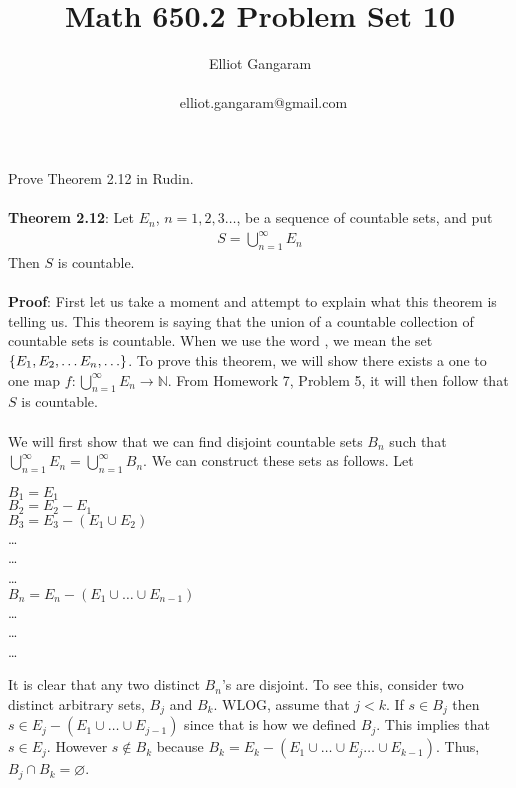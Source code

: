 \documentclass[12pt]{article}
\title{Math 650.2  Problem Set 10}
\author{Elliot Gangaram\\
\date{}
\ elliot.gangaram@gmail.com \\}
\begin{document}
\maketitle

\problem
Prove Theorem 2.12 in Rudin. \\ \\

\noindent \textbf{Theorem 2.12}: Let $E_{n}$, $n=1, 2, 3 \ldots$, be a sequence of countable sets, and put 
\begin{align*}
S= \bigcup^{\infty}_{n=1} E_{n}
\end{align*}
Then $S$ is countable. \\ \\

\noindent \textbf{Proof}: First let us take a moment and attempt to explain what this theorem is telling us. This theorem is saying that the union of a countable collection of countable sets is countable. When we use the word , we mean the set $\left\{E_{1}, E_{2}, \ldots E_{n}, \ldots\right\}$. To prove this theorem, we will show there exists a one to one map $f:\bigcup^{\infty}_{n=1} E_{n} \rightarrow \mathbb{N}$. From Homework 7, Problem 5, it will then follow that $S$ is countable. \\ \\ 

We will first show that we can find disjoint countable sets $B_{n}$ such that $\bigcup^{\infty}_{n=1} E_{n}=\bigcup^{\infty}_{n=1} B_{n}$. We can construct these sets as follows. Let \\ 
\begin{flushleft}
$B_{1}=E_{1}$ \\
$B_{2}=E_{2}-E_{1}$ \\ 
$B_{3}=E_{3}-(E_{1} \cup E_{2})$ \\
\ldots \\ 
\ldots \\
\ldots \\
$B_{n}=E_{n}- (E_{1} \cup \ldots \cup E_{n-1})$ \\ 
\ldots \\
\ldots \\ 
\ldots
\end{flushleft}

It is clear that any two distinct $B_{n}$'s are disjoint. To see this, consider two distinct arbitrary sets, $B_{j}$ and $B_{k}$. WLOG, assume that $j<k$. If $s \in B_{j}$ then $s \in E_{j}-(E_{1} \cup \ldots \cup E_{j-1})$ since that is how we defined $B_{j}$. This implies that $s \in E_{j}$. However $s \notin B_{k}$ because $B_{k} = E_{k} - (E_{1} \cup \ldots \cup E_{j} \ldots \cup E_{k-1})$. Thus, $B_{j} \cap B_{k} = \varnothing$. \\ \\
\end{document}
